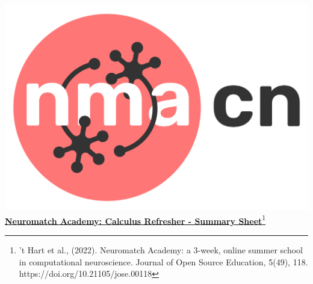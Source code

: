 \newpage

\clearpage
\includegraphics[scale=0.03]{Figures/NMACN.png}\href{https://compneuro.neuromatch.io/tutorials/intro.html}{\textbf{\Huge{Neuromatch Academy: Calculus Refresher - Summary Sheet}}\footnote{’t Hart et al., (2022). Neuromatch Academy: a 3-week, online summer school in computational neuroscience. Journal of Open Source Education, 5(49), 118. https://doi.org/10.21105/jose.00118}}
